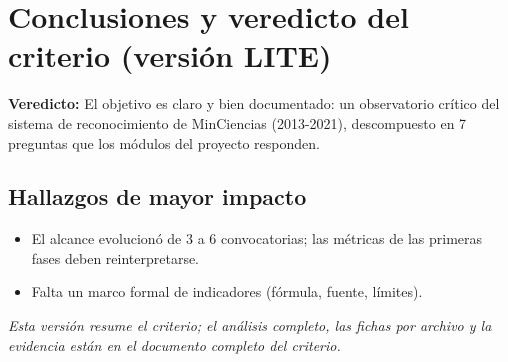 \section{Conclusiones y veredicto del criterio (versión LITE)}

\begin{tcolorbox}[hallazgo]
\textbf{Veredicto:} El objetivo es claro y bien documentado: un observatorio crítico del sistema de reconocimiento de MinCiencias (2013-2021), descompuesto en 7 preguntas que los módulos del proyecto responden.

\end{tcolorbox}

\subsection{Hallazgos de mayor impacto}

\begin{itemize}
  \item El alcance evolucionó de 3 a 6 convocatorias; las métricas de las primeras fases deben reinterpretarse.
  \item Falta un marco formal de indicadores (fórmula, fuente, límites).
\end{itemize}

\noindent\textit{Esta versión resume el criterio; el análisis completo, las
fichas por archivo y la evidencia están en el documento completo del criterio.}
